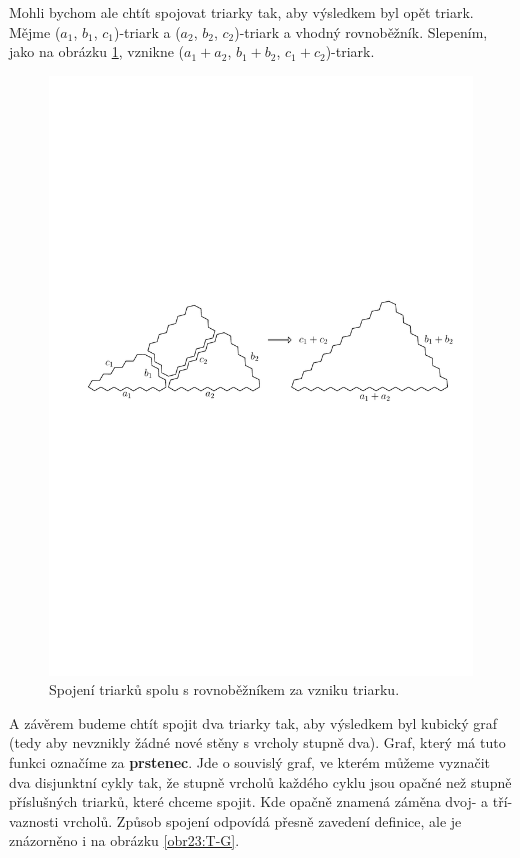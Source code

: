 Mohli bychom ale chtít spojovat triarky tak, aby výsledkem byl opět triark. Mějme ($a_1$, $b_1$, $c_1$)-triark a ($a_2$, $b_2$, $c_2$)-triark a vhodný rovnoběžník. Slepením, jako na obrázku \ref{obr22:T-T}, vznikne ($a_1+a_2$, $b_1+b_2$, $c_1+c_2$)-triark. 

\begin{figure}[h!]\centering
\includegraphics[width=\textwidth]{../img/T-T}
\caption{Spojení triarků spolu s rovnoběžníkem za vzniku triarku.}
\label{obr22:T-T}
\end{figure}

A závěrem budeme chtít spojit dva triarky tak, aby výsledkem byl kubický graf (tedy aby nevznikly žádné nové stěny s vrcholy stupně dva). Graf, který má tuto funkci označíme za \textbf{prstenec}. Jde o souvislý graf, ve kterém můžeme vyznačit dva disjunktní cykly tak, že stupně vrcholů každého cyklu jsou opačné než stupně příslušných triarků, které chceme spojit. Kde opačně znamená záměna dvoj- a tří- vaznosti vrcholů. Způsob spojení odpovídá přesně zavedení definice, ale je znázorněno i na obrázku \ref{obr23:T-G}. 

